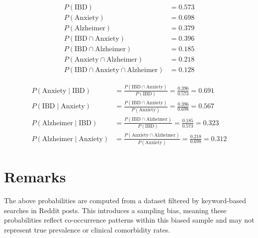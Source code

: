 \documentclass[12pt]{article}
\begin{document}
\begin{align*}
P(\text{IBD}) &= 0.573 \\
P(\text{Anxiety}) &= 0.698 \\
P(\text{Alzheimer}) &= 0.379 \\
P(\text{IBD} \cap \text{Anxiety}) &= 0.396 \\
P(\text{IBD} \cap \text{Alzheimer}) &= 0.185 \\
P(\text{Anxiety} \cap \text{Alzheimer}) &= 0.218 \\
P(\text{IBD} \cap \text{Anxiety} \cap \text{Alzheimer}) &= 0.128
\end{align*}

\bigskip

\begin{align*}
P(\text{Anxiety} \mid \text{IBD}) &= \frac{P(\text{IBD} \cap \text{Anxiety})}{P(\text{IBD})} = \frac{0.396}{0.573} = 0.691 \\
P(\text{IBD} \mid \text{Anxiety}) &= \frac{P(\text{IBD} \cap \text{Anxiety})}{P(\text{Anxiety})} = \frac{0.396}{0.698} = 0.567 \\
P(\text{Alzheimer} \mid \text{IBD}) &= \frac{P(\text{IBD} \cap \text{Alzheimer})}{P(\text{IBD})} = \frac{0.185}{0.573} = 0.323 \\
P(\text{Alzheimer} \mid \text{Anxiety}) &= \frac{P(\text{Anxiety} \cap \text{Alzheimer})}{P(\text{Anxiety})} = \frac{0.218}{0.698} = 0.312
\end{align*}

\section*{Remarks}

The above probabilities are computed from a dataset filtered by keyword-based searches in Reddit posts. This introduces a sampling bias, meaning these probabilities reflect co-occurrence patterns within this biased sample and may not represent true prevalence or clinical comorbidity rates.
\end{document}
